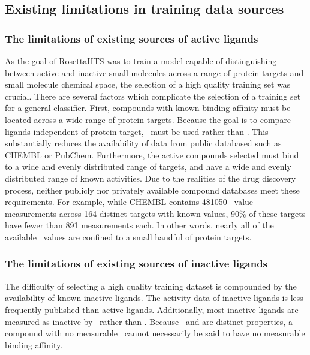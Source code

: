 \subsection{Existing limitations in training data sources}

\subsubsection{The limitations of existing sources of active ligands}
As the goal of RosettaHTS was to train a model capable of distinguishing between active and inactive small molecules across a range of protein targets and small molecule chemical space, the selection of a high quality training set was crucial.
There are several factors which complicate the selection of a training set for a general classifier.
First, compounds with known binding affinity must be located across a wide range of protein targets.
Because the goal is to compare ligands independent of protein target, \ki\ must be used rather than \ic.
This substantially reduces the availability of data from public databased such as CHEMBL or PubChem. 
Furthermore, the active compounds selected must bind to a wide and evenly distributed range of targets, and have a wide and evenly distributed range of known activities.
Due to the realities of the drug discovery process, neither publicly nor privately available compound databases meet these requirements.
For example, while CHEMBL contains 481050 \ki\ value measurements across 164 distinct targets with known \ki values, 90\% of these targets have fewer than 891 measurements each.
In other words, nearly all of the available \ki\ values are confined to a small handful of protein targets.

\subsubsection{The limitations of existing sources of inactive ligands}
The difficulty of selecting a high quality training dataset is compounded by the availability of known inactive ligands. 
The activity data of inactive ligands is less frequently published than active ligands.
Additionally, most inactive ligands are measured as inactive by \ic\ rather than \ki.
Because \ic\ and \ki are distinct properties, a compound with no measurable \ic\ cannot necessarily be said to have no measurable binding affinity.

